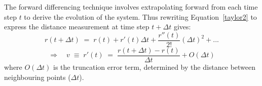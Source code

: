 \documentclass[namedreferences]{SolarPhysics}
\begin{document}
\begin{article}
The forward differencing technique involves extrapolating forward from each time step $t$ to derive the evolution of the system. Thus rewriting Equation~\ref{taylor2} to express the distance measurement at time step $t+\Delta t$ gives:
\begin{equation}
r(t + \Delta t) \; = \; r(t) + r'(t)\Delta t +  \frac{r''(t)}{2!}(\Delta t)^{2} + ...
\end{equation}
\begin{equation}
\Rightarrow \quad v \; \equiv \; r'(t) \; = \; \frac{r(t + \Delta t) - r(t)}{\Delta t} + O(\Delta t)
\end{equation}
where $O(\Delta t)$ is the truncation error term, determined by the distance between neighbouring points ($\Delta t$). %

\end{article}
\end{document}
